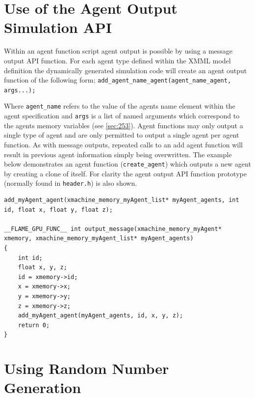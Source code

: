 \documentclass[11pt, a4paper, onecolumn, oneside]{report}
\begin{document}
\section{Use of the Agent Output Simulation API}
\label{sec:36}

Within an agent function script agent output is possible by using a message output API function.
For each agent type defined within the XMML model definition the dynamically generated simulation code will create an agent output function of the following form; 
\texttt{add_agent_name_agent(agent_name_agent, args...);}

Where \texttt{agent_name} refers to the value of the agents name element within the agent specification and \texttt{args} is a list of named arguments which correspond to the agents memory variables (see \cref{sec:253}).
Agent functions may only output a single type of agent and are only permitted to output a single agent per agent function.
As with message outputs, repeated calls to an add agent function will result in previous agent information simply being overwritten.
The example below demonstrates an agent function (\texttt{create_agent}) which outputs a new agent by creating a clone of itself.
For clarity the agent output API function prototype (normally found in \texttt{header.h}) is also shown.

\begin{verbatim}
add_myAgent_agent(xmachine_memory_myAgent_list* myAgent_agents, int id, float x, float y, float z);

__FLAME_GPU_FUNC__ int output_message(xmachine_memory_myAgent* xmemory, xmachine_memory_myAgent_list* myAgent_agents)
{
    int id;
    float x, y, z;
    id = xmemory->id;
    x = xmemory->x;
    y = xmemory->y;
    z = xmemory->z;
    add_myAgent_agent(myAgent_agents, id, x, y, z);
    return 0;
}
\end{verbatim}


\section{Using Random Number Generation}
\label{sec:37}
\end{document}
